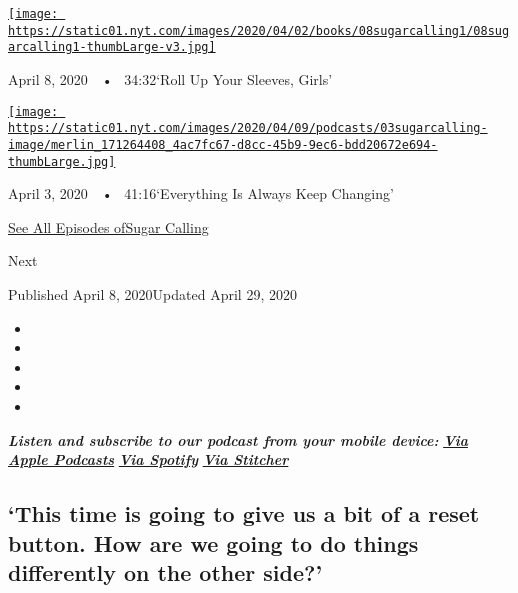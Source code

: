 \href{https://www.nytimes.com/2020/04/08/podcasts/sugar-calling-margaret-atwood-coronavirus.html?action=click\&module=audio-series-bar\&region=header\&pgtype=Article}{\texttt{[image: https://static01.nyt.com/images/2020/04/02/books/08sugarcalling1/08sugarcalling1-thumbLarge-v3.jpg]}}

April 8, 2020~~•~ 34:32`Roll Up Your Sleeves, Girls'

\href{https://www.nytimes.com/2020/04/03/podcasts/sugar-calling-george-saunders-coronavirus.html?action=click\&module=audio-series-bar\&region=header\&pgtype=Article}{\texttt{[image: https://static01.nyt.com/images/2020/04/09/podcasts/03sugarcalling-image/merlin\_171264408\_4ac7fc67-d8cc-45b9-9ec6-bdd20672e694-thumbLarge.jpg]}}

April 3, 2020~~•~ 41:16`Everything Is Always Keep Changing'

\href{https://www.nytimes.com/column/sugar-calling}{See All Episodes
ofSugar Calling}

Next

Published April 8, 2020Updated April 29, 2020

\begin{itemize}
\item
\item
\item
\item
\item
\end{itemize}

\emph{\textbf{Listen and subscribe to our podcast from your mobile
device:}}
\textbf{\href{https://podcasts.apple.com/us/podcast/sugar-calling/id1505881384}{\emph{Via
Apple Podcasts}}} \emph{\textbf{\textbar{}}}
\textbf{\href{https://open.spotify.com/show/4U8hPiNGIBvTS9zLeiDCN7?si=gRyigD47SPWl-QWgNjgt2w}{\emph{Via
Spotify}}} \emph{\textbf{\textbar{}}}
\textbf{\href{https://www.stitcher.com/podcast/the-new-york-times/sugar-calling}{\emph{Via
Stitcher}}}

\hypertarget{this-time-is-going-to-give-us-a-bit-of-a-reset-button-how-are-we-going-to-do-things-differently-on-the-other-side}{%
\subsection{`This time is going to give us a bit of a reset button. How
are we going to do things differently on the other
side?'}\label{this-time-is-going-to-give-us-a-bit-of-a-reset-button-how-are-we-going-to-do-things-differently-on-the-other-side}}

